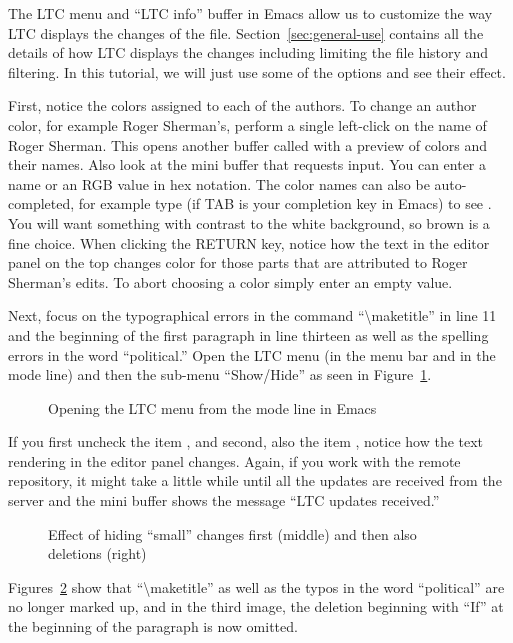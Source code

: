 The LTC menu and ``LTC info'' buffer in Emacs allow us to customize the way LTC displays the changes of the file.  Section~\ref{sec:general-use} contains all the details of how LTC displays the changes including limiting the file history and filtering.  In this tutorial, we will just use some of the options and see their effect.

First, notice the colors assigned to each of the authors.  To change an author color, for example Roger Sherman's,  perform a single left-click on the name of Roger Sherman.  This opens another buffer called  with a preview of colors and their names.  Also look at the mini buffer that requests input.   You can enter a name or an RGB value in hex notation.  The color names can also be auto-completed, for example type  (if TAB is your completion key in Emacs) to see .  You will want something with contrast to the white background, so brown is a fine choice.  When clicking the RETURN key, notice how the text in the editor panel on the top changes color for those parts that are attributed to Roger Sherman's edits.  To abort choosing a color simply enter an empty value.

Next, focus on the typographical errors in the command ``\textbackslash maketitle'' in line 11 and the beginning of the first paragraph in line thirteen as well as the spelling errors in the word ``political.''  Open the LTC menu (in the menu bar and in the mode line) and then the sub-menu ``Show/Hide'' as seen in Figure~\ref{fig:svn-emacs-LTC-menu}.  
\begin{figure}[t]
\centering
{}
\caption{Opening the LTC menu from the mode line in Emacs} \label{fig:svn-emacs-LTC-menu}
\end{figure}
If you first uncheck the item , and second, also the item , notice how the text rendering in the editor panel changes.  Again, if you work with the remote repository, it might take a little while until all the updates are received from the server and the mini buffer shows the message ``LTC updates received.''
\begin{figure}[t]
  \centering
  \hspace{2em}
  \hspace{2em}
\caption[Effect of hiding ``small'' changes and deletions]{Effect of hiding ``small'' changes first (middle) and then also deletions (right)} \label{fig:svn-emacs-filter-small}
\end{figure}
Figures~\ref{fig:svn-emacs-filter-small} show that ``\textbackslash maketitle'' as well as the typos in the word ``political'' are no longer marked up, and in the third image, the deletion beginning with ``If'' at the beginning of the paragraph is now omitted.


